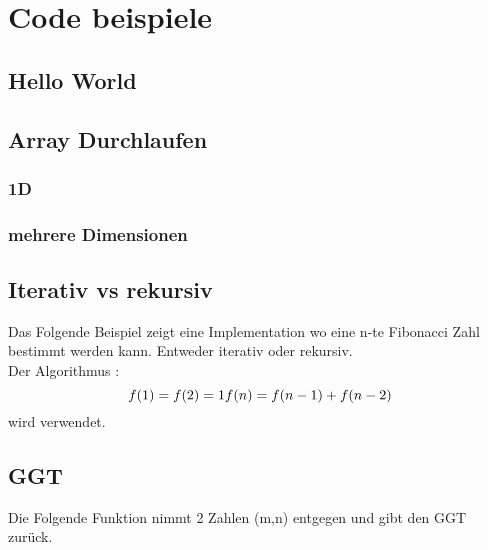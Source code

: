 \section{Code beispiele}

\subsection{Hello World}



\subsection{Array Durchlaufen}

\subsubsection{1D}



\subsubsection{mehrere Dimensionen}



\nextcol	

\subsection{Iterativ vs rekursiv}

Das Folgende Beispiel zeigt eine Implementation wo eine n-te Fibonacci Zahl bestimmt werden kann. Entweder iterativ oder rekursiv.\\
Der Algorithmus : \[ f(1) = f(2) = 1 \\ f(n) = f(n-1) + f(n-2) \] wird verwendet.



\nextcol	

\subsection{GGT}

Die Folgende Funktion nimmt 2 Zahlen (m,n) entgegen und gibt den GGT zurück.

